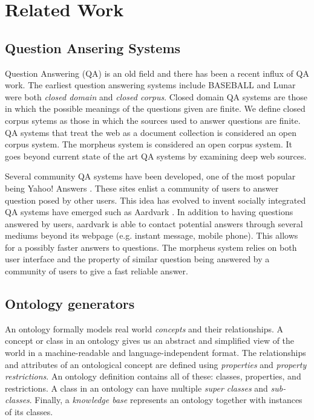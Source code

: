 \section{Related Work}
\label{sec:relatedwork}

\subsection{Question Ansering Systems} 

Question Answering (QA) is an old field and there has been a recent influx of QA work. The earliest question answering systems include BASEBALL \cite{Green1961} and Lunar \cite{woods1973} were both \emph{closed domain} and \emph{closed corpus}.  Closed domain QA systems are those in which the possible meanings of the questions given are finite. We define closed corpus sytems as those in which the sources used to answer questions are finite.  QA systems that treat the web as a document collection is considered an open corpus system.  The morpheus system is considered an open corpus system.  It goes beyond current state of the art QA systems by examining deep web sources.

Several community QA systems have been developed, one of the most popular being Yahoo! Answers \cite{yahooanswers2008}.  These sites enlist a community of users to answer question posed by other users.  This idea has evolved to invent socially integrated QA systems have emerged such as Aardvark \cite{vark2010}. In addition to having questions answered by users, aardvark is able to contact potential answers through several mediums beyond its webpage (e.g. instant message, mobile phone).  This allows for a possibly faster answers to questions.  The morpheus system relies on both user interface and the property of similar question being answered by a community of users to give a fast reliable answer.


\subsection{Ontology generators} 
\label{sec:ontology_generators}

An ontology formally models real world \textit{concepts} and their
relationships. A concept or class in an ontology gives us an abstract and
simplified view of the world\cite{Gruber1993} in a machine-readable and
language-independent format. The relationships and attributes of an
ontological concept are defined using \textit{properties} and \textit{property
restrictions}. An ontology definition contains all of
these: classes, properties, and restrictions. A class in an ontology can have
multiple \textit{super classes} and \textit{sub-classes}. Finally, a
\textit{knowledge base} represents an ontology together with 
instances of its classes.      


